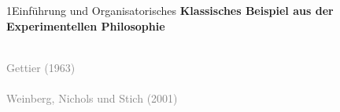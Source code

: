 \documentclass[xcolor=table,9pt,aspectratio=169]{beamer}
\begin{document}
\begin{frame}{\vspace*{10mm}1\hspace*{1em}Einführung und Organisatorisches}
\textbf{Klassisches Beispiel aus der Experimentellen Philosophie}\\
\begin{multicols}{2}
   \begin{center}
      \\
      \textcolor{gray}{Gettier (1963)}\\
      \\
      \textcolor{gray}{Weinberg, Nichols und Stich (2001)}
   \end{center}
\end{multicols}
\end{frame}
\end{document}
